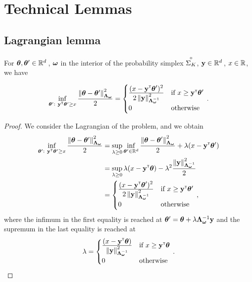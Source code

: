 \section{Technical Lemmas}\label{app:lgc.lemmas}

\subsection{Lagrangian lemma}\label{app:lgc.lemmas.lagrange}

\begin{lemma}\label{lemma:lgc.lagrange_alternative}
For $\btheta, \btheta' \in \R^d\,$, $\bomega$ in the interior of the probability simplex $\interior{\Sigma_K}$, $\by\in\R^d\,$, $x\in\R$, we have

\begin{align*}
    \inf_{\btheta':\ \by\transpose\btheta' \geq x} \frac{\normm{\btheta-\btheta'}^2_{\bLambda_{\bomega}}}{2} = 
    \begin{cases}
        \ddfrac{(x - \by\transpose\btheta')^2}{2 \normm{\by}_{\bLambda_{\bomega}^{-1}}^2} &\text{if } x \geq \by\transpose\btheta' \\
        0 &\text{otherwise}
    \end{cases}\,.
\end{align*}
\end{lemma}

\begin{proof}
We consider the Lagrangian of the problem, and we obtain
\begin{align*}
  \inf_{\btheta':\ \by\transpose\btheta' \geq x} \frac{\normm{\btheta-\btheta'}^2_{\bLambda_{\bomega}}}{2}
  &= \sup_{\lambda \geq 0}\inf_{\btheta' \in \R^d} \ddfrac{\normm{\btheta-\btheta'}^2_{\bLambda_{\bomega}}}{2}+ \lambda (x-\by\transpose\btheta')\\
  &=  \sup_{\lambda \geq 0} \lambda (x-\by\transpose\btheta) - \lambda^2 \frac{\normm{\by}^2_{\bLambda_{\bomega}^{-1}}}{2}\\
  &= \begin{cases}
    \ddfrac{(x - \by\transpose\btheta')^2}{2 \normm{\by}_{\bLambda_{\bomega}^{-1}}^2} &\text{if } x \geq \by\transpose\btheta' \\
    0 &\text{otherwise}
    \end{cases}\,,
\end{align*}
where the infimum in the first equality is reached at $\btheta' = \btheta + \lambda \bLambda_{\bomega}^{-1} \by$ and the supremum in the last equality is reached at
\[
    \lambda =
    \begin{cases}
        \ddfrac{(x- \by\transpose\btheta)}{\normm{\by}_{\bLambda_{\bomega}^{-1}}^2} &\text{if } x \geq \by\transpose\btheta \\
        0 &\text{otherwise}
    \end{cases}\,.
\]
\end{proof}


